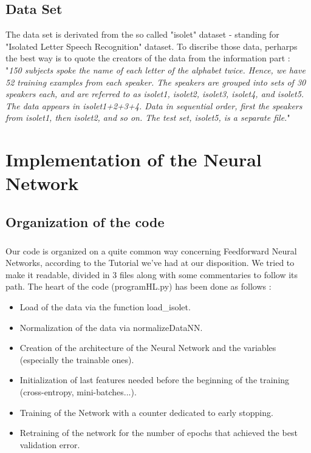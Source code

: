 \documentclass[a4paper]{report}
\begin{document}
\section{Data Set}
The data set is derivated from the so called "isolet" dataset - standing for "Isolated Letter Speech Recognition" dataset. To discribe those data, perharps the best way is to quote the creators of the data from the information part :
\\"\textit{150 subjects spoke the name of each letter of the alphabet twice. Hence, we have 52 training examples from each speaker. The speakers are grouped into sets of 30 speakers each, and are referred to as isolet1, isolet2, isolet3, isolet4, and isolet5. The data appears in isolet1+2+3+4. Data in sequential order, first the speakers from isolet1, then isolet2, and so on.  The test set, isolet5, is a separate file.}" 

\chapter{Implementation of the Neural Network}
\section{Organization of the code}
\paragraph{}Our code is organized on a quite common way concerning Feedforward Neural Networks, according to the Tutorial we've had at our disposition. We tried to make it readable, divided in 3 files along with some commentaries to follow its path. The heart of the code (programHL.py) has been done as follows :
\begin{itemize}
\item Load of the data via the function load\_isolet.
\item Normalization of the data via normalizeDataNN.
\item Creation of the architecture of the Neural Network and the variables (especially the trainable ones).
\item Initialization of last features needed before the beginning of the training (cross-entropy, mini-batches...).
\item Training of the Network with a counter dedicated to early stopping.
\item Retraining of the network for the number of epochs that achieved the best validation error.
\end{itemize}
\end{document}
